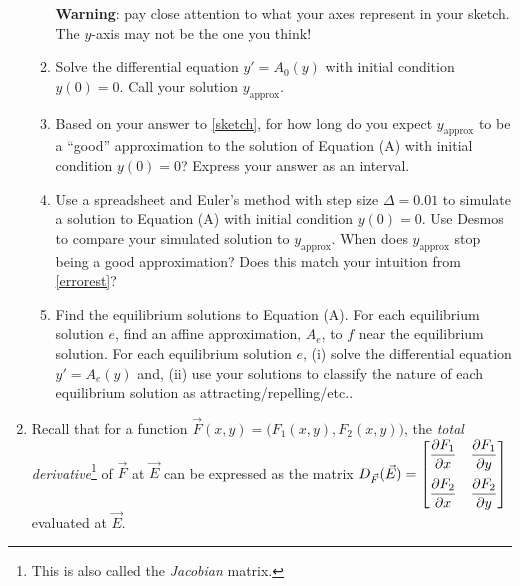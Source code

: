 \begin{enumerate}
\begin{enumerate}
		            \textbf{Warning}: pay close attention to what your
		            axes represent in your sketch. The $y$-axis may not be the one you think!

		      \item Solve the differential equation $y'=A_0(y)$ with initial condition $y(0)=0$. Call your solution $y_{\text{approx}}$.

		      \item\label{errorest} Based on your answer to \ref{sketch}, for how long do you expect $y_{\text{approx}}$ to
		            be a ``good'' approximation to the solution of Equation (A) with initial condition $y(0)=0$? Express your answer as an interval.

		      \item Use a spreadsheet and Euler's method with step size $\Delta=0.01$ to simulate a solution to Equation (A) with initial condition $y(0)=0$.
		            Use Desmos to compare your simulated solution to $y_{\text{approx}}$.
		            When does $y_{\text{approx}}$ stop being a good approximation? Does this match your intuition from \ref{errorest}?

		      \item Find the equilibrium solutions to Equation (A). For each equilibrium solution $e$, find an affine
		            approximation, $A_e$, to $f$ near the equilibrium solution. For each equilibrium solution $e$, (i) solve
		            the differential equation $y'=A_e(y)$ and, (ii) use your solutions to classify the nature of each equilibrium solution
		            as attracting/repelling/etc..
	      \end{enumerate}

	\item

	      Recall that for a function $\vec F(x,y)=\Big(F_1(x,y), F_2(x,y)\Big)$,
	      the \emph{total derivative}\footnote{ This is also called the \emph{Jacobian} matrix.} of $\vec F$ at $\vec E$ can be expressed
	      as the matrix
	      $
		      D_{\vec F}(\vec E) = \mat{
			      \rule[-0.5cm]{0pt}{.8cm}\displaystyle \frac{\partial F_1}{\partial x} &\displaystyle  \frac{\partial F_1}{\partial y}\\
			      \rule[-0.2cm]{0pt}{.3cm}\displaystyle  \frac{\partial F_2}{\partial x} &\displaystyle  \frac{\partial F_2}{\partial y}
		      }
	      $
	      evaluated at $\vec E$.

	      \bigskip


\end{enumerate}
